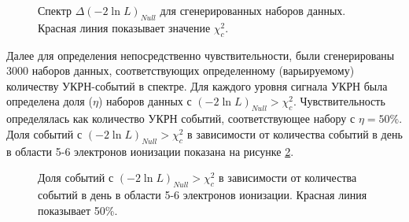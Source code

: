 \begin{figure}[H]
	\caption{Спектр $\Delta(-2 \ln L)_{N u l l}$ для сгенерированных наборов данных. Красная линия показывает значение $\chi^2_{c}$.}
	\label{img:deltaloglikelihood}
\end{figure}

Далее для определения непосредственно чувствительности, были сгенерированы 3000 наборов данных, соответствующих определенному (варьируемому) количеству УКРН-событий в спектре. Для каждого уровня сигнала УКРН была определена доля ($\eta$) наборов данных с $(-2 \ln L)_{N u l l} > \chi^2_{c}$. Чувствительность определялась как количество УКРН событий, соответствующее набору с $\eta = 50\%$. Доля событий с $(-2 \ln L)_{N u l l} > \chi^2_{c}$ в зависимости от количества событий в день в области 5-6 электронов ионизации показана на рисунке \ref{img:rejectedsim}. 
\begin{figure}[H]
	\caption{Доля событий с $(-2 \ln L)_{N u l l} > \chi^2_{c}$ в зависимости от количества событий в день в области 5-6 электронов ионизации. Красная линия показывает 50\%.}
	\label{img:rejectedsim}
\end{figure}

